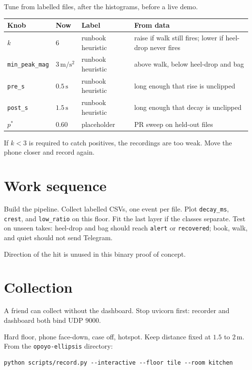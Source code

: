 \documentclass[11pt,a4paper]{article}
\begin{document}
Tune from labelled files, after the histograms, before a live demo.

\begin{center}
\small
\begin{tabular}{@{}llll@{}}
\toprule
Knob & Now & Label & From data \\
\midrule
\(k\) & \(6\) & runbook heuristic & raise if walk still fires; lower if heel-drop never fires \\
\texttt{min\_peak\_mag} & \(3\,\mathrm{m/s^2}\) & runbook heuristic & above walk, below heel-drop and bag \\
\texttt{pre\_s} & \(0.5\,\mathrm{s}\) & runbook heuristic & long enough that rise is unclipped \\
\texttt{post\_s} & \(1.5\,\mathrm{s}\) & runbook heuristic & long enough that decay is unclipped \\
\(p^*\) & \(0.60\) & placeholder & PR sweep on held-out files \\
\bottomrule
\end{tabular}
\end{center}

If \(k<3\) is required to catch positives, the recordings are too weak. Move the phone closer and record again.

\section{Work sequence}

Build the pipeline. Collect labelled CSVs, one event per file. Plot \texttt{decay\_ms}, \texttt{crest}, and \texttt{low\_ratio} on this floor. Fit the last layer if the classes separate. Test on unseen takes: heel-drop and bag should reach \texttt{alert} or \texttt{recovered}; book, walk, and quiet should not send Telegram.

Direction of the hit is unused in this binary proof of concept.

\appendix
\section{Collection}

A friend can collect without the dashboard. Stop uvicorn first: recorder and dashboard both bind UDP \(9000\).

Hard floor, phone face-down, case off, hotspot. Keep distance fixed at \(1.5\) to \(2\,\mathrm{m}\). From the \texttt{opoyo-ellipsis} directory:

\begin{verbatim}
python scripts/record.py --interactive --floor tile --room kitchen
\end{verbatim}
\end{document}
